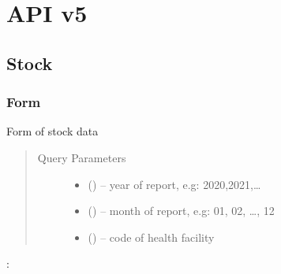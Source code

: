\documentclass[letterpaper,10pt,english,openany,oneside]{sphinxmanual}
\begin{document}
\chapter{API v5}
\label{\detokenize{api/v5:api-v5}}\label{\detokenize{api/v5::doc}}

\section{Stock}
\label{\detokenize{api/v5:stock}}

\subsection{Form}
\label{\detokenize{api/v5:form}}

\begin{fulllineitems}
\label{\detokenize{api/v5:post--api5-Stocks-stock_form}}
\sphinxAtStartPar
Form of stock data
\begin{quote}\begin{description}
\item[{Query Parameters}] \leavevmode\begin{itemize}
\item {} 
\sphinxAtStartPar
{} () – year of report, e.g: 2020,2021,…

\item {} 
\sphinxAtStartPar
{} () – month of report, e.g: 01, 02, …, 12

\item {} 
\sphinxAtStartPar
{} () – code of health facility

\end{itemize}

\end{description}\end{quote}

\sphinxAtStartPar
{}:


\end{fulllineitems}
\end{document}

